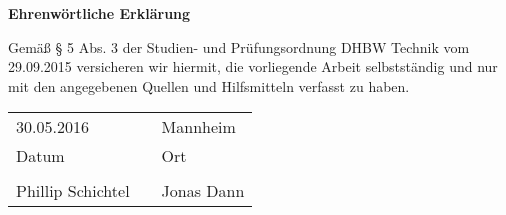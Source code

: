 {\Large \textbf{Ehrenwörtliche Erklärung}}
\vspace{15mm}

Gemäß § 5 Abs. 3 der Studien- und Prüfungsordnung DHBW Technik vom 
29.09.2015 versicheren wir hiermit, die vorliegende Arbeit selbstständig 
und nur mit den angegebenen Quellen und Hilfsmitteln verfasst zu haben.

\vspace{2cm}
\begin{tabular}{p{5cm} p{3cm} p{6cm}}
	30.05.2016 & & Mannheim\\
	\cline{1-1}\cline{3-3}
	Datum &  & Ort  \\
	& & \\[2cm]
	\cline{1-1}\cline{3-3}
	Phillip Schichtel & & Jonas Dann
\end{tabular}